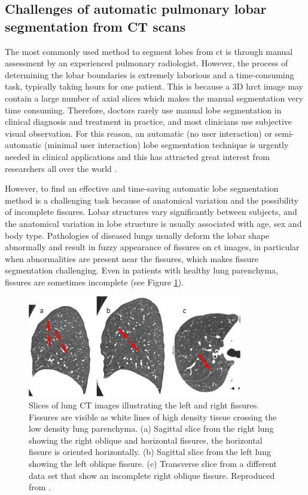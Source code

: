\subsection{Challenges of automatic pulmonary lobar segmentation from CT scans} \label{SegmentationChallenge}
The most commonly used method to segment lobes from \gls{ct} is through manual assessment by an experienced pulmonary radiologist. However, the process of determining the lobar boundaries is extremely laborious and a time-consuming task, typically taking hours for one patient. This is because a 3D \gls{hrct} image may contain a large number of axial slices which makes the manual segmentation very time consuming. Therefore, doctors rarely use manual lobe segmentation in clinical diagnosis and treatment in practice, and most clinicians use subjective visual observation. For this reason, an automatic (no user interaction) or semi-automatic (minimal user interaction) lobe segmentation technique is urgently needed in clinical applications and this has attracted great interest from researchers all over the world \citep{van2013automated,pu2009computational,ukil2009anatomy}.

However, to find an effective and time-saving automatic lobe segmentation method is a challenging task because of anatomical variation and the possibility of incomplete fissures. Lobar structures vary significantly between subjects, and the anatomical variation in lobe structure is usually associated with age, sex and body type. Pathologies of diseased lungs usually deform the lobar shape abnormally and result in fuzzy appearance of fissures on \gls{ct} images, in particular when abnormalities are present near the fissures, which makes fissure segmentation challenging. Even in patients with healthy lung parenchyma, fissures are sometimes incomplete \citep{gulsun2006variability, doel2015review} (see Figure \ref{fig:FissureSegmentationChanllenges}).

\begin{figure}[htbp]
  \centering 
  \includegraphics[height=1.75in]{Segmentation/Image/FissureSegmentationChanllenges.jpg}
  \caption{Slices of lung CT images illustrating the left and right fissures. Fissures are visible as white lines of high density tissue crossing the low density lung parenchyma. (a) Sagittal slice from the right lung showing the right oblique and horizontal fissures, the horizontal fissure is oriented horizontally. (b) Sagittal slice from the left lung showing the left oblique fissure. (c) Transverse slice from a different data set that show an incomplete right oblique fissure. Reproduced from \citep{ukil2009anatomy}.}
  \label{fig:FissureSegmentationChanllenges}
\end{figure}

